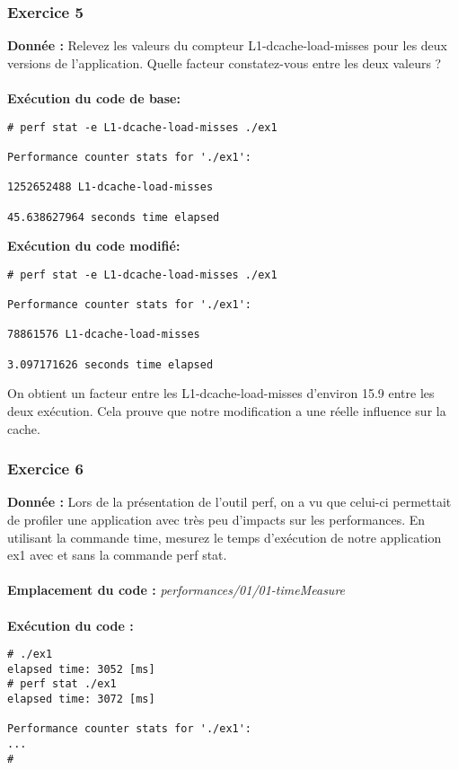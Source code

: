 \subsubsection{Exercice 5}
\textbf{Donnée : } Relevez	les	valeurs	du	compteur	L1-dcache-load-misses	pour	les	deux	versions	de	l'application.	Quelle	
facteur	constatez-vous	entre	les	deux	valeurs	?\\\\

\textbf{Exécution du code de base: } \\
\begin{lstlisting}
# perf stat -e L1-dcache-load-misses ./ex1 

Performance counter stats for './ex1':

1252652488 L1-dcache-load-misses                                       

45.638627964 seconds time elapsed
\end{lstlisting}

\textbf{Exécution du code modifié: } \\
\begin{lstlisting}
# perf stat -e L1-dcache-load-misses ./ex1 

Performance counter stats for './ex1':

78861576 L1-dcache-load-misses                                       

3.097171626 seconds time elapsed

\end{lstlisting}

On obtient un facteur entre les L1-dcache-load-misses d'environ 15.9 entre les deux exécution. Cela prouve que notre modification a une réelle influence sur la cache.

\subsubsection{Exercice 6}
\textbf{Donnée : } Lors	de	la	présentation	de	l'outil	perf,	on	a	vu	que	celui-ci	permettait	de	profiler	une	application	avec	
très	peu	d'impacts	sur	les	performances.	En	utilisant	la	commande	time,	mesurez	le	temps	d'exécution	
de	notre	application	ex1	avec	et	sans	la	commande	perf	stat.\\\\
\textbf{Emplacement du code : }\textit{performances/01/01-timeMeasure}\\\\
\textbf{Exécution du code : } \\
\begin{lstlisting}
# ./ex1                                                                         
elapsed time: 3052 [ms]                                                         
# perf stat ./ex1                                                               
elapsed time: 3072 [ms]                                                         

Performance counter stats for './ex1':                                         
...                                       
# 
\end{lstlisting}

